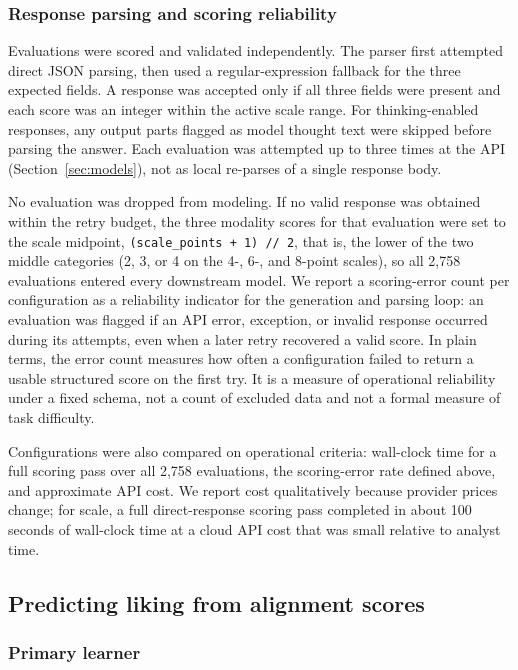 \documentclass[11pt]{article}
\begin{document}
\subsubsection{Response parsing and scoring reliability}
\label{sec:parsing}

Evaluations were scored and validated independently. The parser first
attempted direct JSON parsing, then used a regular-expression fallback for the
three expected fields. A response was accepted only if all three fields were
present and each score was an integer within the active scale range. For
thinking-enabled responses, any output parts flagged as model thought text were
skipped before parsing the answer. Each evaluation was attempted up to three
times at the API (Section~\ref{sec:models}), not as local re-parses of a single
response body.

No evaluation was dropped from modeling. If no valid response was obtained
within the retry budget, the three modality scores for that evaluation were
set to the scale midpoint, \texttt{(scale\_points + 1) // 2}, that is, the
lower of the two middle categories (2, 3, or 4 on the 4-, 6-, and 8-point
scales), so all 2,758 evaluations entered every downstream model. We report a scoring-error count
per configuration as a reliability indicator for the generation and parsing
loop: an evaluation was flagged if an API error, exception, or invalid
response occurred during its attempts, even when a later retry recovered a
valid score. In plain terms, the error count measures how often a
configuration failed to return a usable structured score on the first try. It
is a measure of operational reliability under a fixed schema, not a count of
excluded data and not a formal measure of task difficulty.

Configurations were also compared on operational criteria: wall-clock time for
a full scoring pass over all 2,758 evaluations, the scoring-error rate defined
above, and approximate API cost. We report cost qualitatively because provider
prices change; for scale, a full direct-response scoring pass completed in
about 100 seconds of wall-clock time at a cloud API cost that was small
relative to analyst time.

\subsection{Predicting liking from alignment scores}
\label{sec:prediction}

\subsubsection{Primary learner}
\label{sec:tabpfn}
\end{document}
